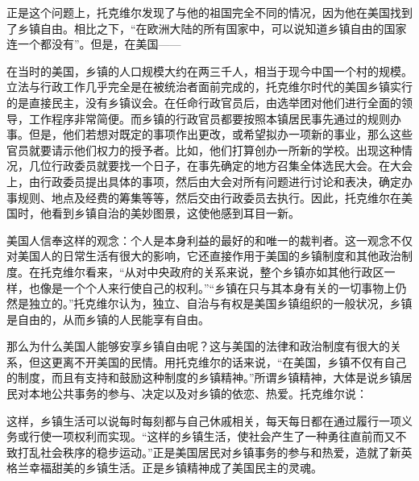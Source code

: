 正是这个问题上，托克维尔发现了与他的祖国完全不同的情况，因为他在美国找到了乡镇自由。相比之下，“在欧洲大陆的所有国家中，可以说知道乡镇自由的国家连一个都没有”。但是，在美国——


在当时的美国，乡镇的人口规模大约在两三千人，相当于现今中国一个村的规模。立法与行政工作几乎完全是在被统治者面前完成的，托克维尔时代的美国乡镇实行的是直接民主，没有乡镇议会。在任命行政官员后，由选举团对他们进行全面的领导，工作程序非常简便。而乡镇的行政官员都要按照本镇居民事先通过的规则办事。但是，他们若想对既定的事项作出更改，或希望拟办一项新的事业，那么这些官员就要请示他们权力的授予者。比如，他们打算创办一所新的学校。出现这种情况，几位行政委员就要找一个日子，在事先确定的地方召集全体选民大会。在大会上，由行政委员提出具体的事项，然后由大会对所有问题进行讨论和表决，确定办事规则、地点及经费的筹集等等，然后交由行政委员去执行。因此，托克维尔在美国时，他看到乡镇自治的美妙图景，这使他感到耳目一新。

美国人信奉这样的观念：个人是本身利益的最好的和唯一的裁判者。这一观念不仅对美国人的日常生活有很大的影响，它还直接作用于美国的乡镇制度和其他政治制度。在托克维尔看来，“从对中央政府的关系来说，整个乡镇亦如其他行政区一样，也像是一个个人来行使自己的权利。”“乡镇在只与其本身有关的一切事物上仍然是独立的。”托克维尔认为，独立、自治与有权是美国乡镇组织的一般状况，乡镇是自由的，从而乡镇的人民能享有自由。

那么为什么美国人能够安享乡镇自由呢？这与美国的法律和政治制度有很大的关系，但这更离不开美国的民情。用托克维尔的话来说，“在美国，乡镇不仅有自己的制度，而且有支持和鼓励这种制度的乡镇精神。”所谓乡镇精神，大体是说乡镇居民对本地公共事务的参与、决定以及对乡镇的依恋、热爱。托克维尔说：


这样，乡镇生活可以说每时每刻都与自己休戚相关，每天每日都在通过履行一项义务或行使一项权利而实现。“这样的乡镇生活，使社会产生了一种勇往直前而又不致打乱社会秩序的稳步运动。”正是美国居民对乡镇事务的参与和热爱，造就了新英格兰幸福甜美的乡镇生活。正是乡镇精神成了美国民主的灵魂。

